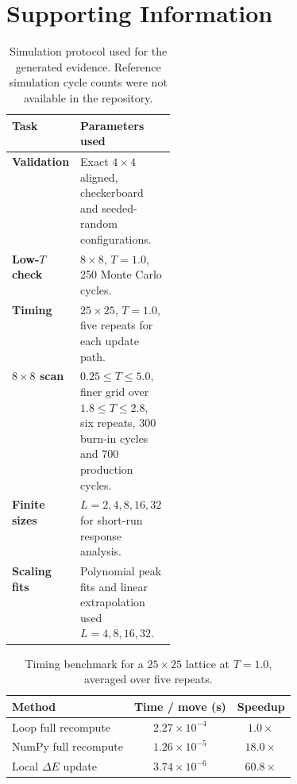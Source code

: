 \documentclass[twoside,twocolumn,9pt]{extarticle}
\begin{document}
\newpage

 

\clearpage
\onecolumn
\setcounter{figure}{0}
\renewcommand{\thefigure}{S\arabic{figure}}
\setcounter{table}{0}
\renewcommand{\thetable}{S\arabic{table}}
\section*{Supporting Information}
\label{sec:si}

\begin{table}[H]
  \centering
  \begin{minipage}{0.88\textwidth}
    \captionsetup{justification=centering,singlelinecheck=true,width=\linewidth}
    \caption{Simulation protocol used for the generated evidence. Reference simulation cycle counts were not available in the repository.}
    \label{tab:si_protocol}
    \begin{tabularx}{\linewidth}{>{\bfseries}p{0.24\linewidth}X}
      \toprule
      Task & Parameters used \\
      \midrule
      Validation & Exact \(4 \times 4\) aligned, checkerboard and seeded-random configurations. \\
      Low-\(T\) check & \(8 \times 8\), \(T=1.0\), 250 Monte Carlo cycles. \\
      Timing & \(25 \times 25\), \(T=1.0\), five repeats for each update path. \\
      \(8 \times 8\) scan & \(0.25\leq T\leq5.0\), finer grid over \(1.8\leq T\leq2.8\), six repeats, 300 burn-in cycles and 700 production cycles. \\
      Finite sizes & \(L=2,4,8,16,32\) for short-run response analysis. \\
      Scaling fits & Polynomial peak fits and linear extrapolation used \(L=4,8,16,32\). \\
      \bottomrule
    \end{tabularx}
  \end{minipage}
\end{table}

\begin{table}[H]
  \centering
  \begin{minipage}{0.62\textwidth}
    \captionsetup{justification=centering,singlelinecheck=true,width=\linewidth}
    \caption{Timing benchmark for a \(25 \times 25\) lattice at \(T=1.0\), averaged over five repeats.}
    \label{tab:si_timing}
    \centering
    \begin{tabular}{lcc}
      \toprule
      Method & Time / move (s) & Speedup \\
      \midrule
      Loop full recompute & \(2.27\times10^{-4}\) & \(1.0\times\) \\
      NumPy full recompute & \(1.26\times10^{-5}\) & \(18.0\times\) \\
      Local \(\Delta E\) update & \(3.74\times10^{-6}\) & \(60.8\times\) \\
      \bottomrule
    \end{tabular}
  \end{minipage}
\end{table}
\end{document}
